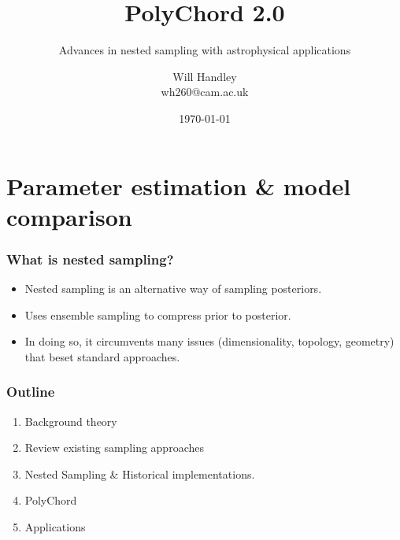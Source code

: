 \documentclass[%
]{beamer}
\title{PolyChord 2.0}
\subtitle{Advances in nested sampling with astrophysical applications}
\author[Handley] %
{Will Handley\\ \small{wh260@cam.ac.uk}}
\institute[University of Cambridge] %
{%
Astrophysics Group \\
Cavendish Laboratory \\
University of Cambridge
}
\date{\today}
\newcommand{\lik}{\mathcal{L}}
\newcommand{\posterior}{\mathcal{P}}
\newcommand{\prior}{\pi}
\newcommand{\ev}{\mathcal{Z}}
\newcommand{\prob}{\mathrm{P}}
\begin{document}
\begin{frame}
  \titlepage
\end{frame}


\section{Parameter estimation \& model comparison}
%
%
%

\begin{frame}
  \frametitle{What is nested sampling?}
  \begin{itemize}
    \pause\item Nested sampling is an alternative way of sampling posteriors. 
    \pause\item Uses ensemble sampling to compress prior to posterior.
    \pause\item In doing so, it circumvents many issues (dimensionality, topology, geometry) that beset standard approaches.
  \end{itemize}
\end{frame}

\begin{frame}
    \frametitle{Outline}
    \begin{enumerate}
        \pause\item Background theory
        \pause\item Review existing sampling approaches
        \pause\item Nested Sampling \& Historical implementations.
        \pause\item PolyChord
        \pause\item Applications
    \end{enumerate}
\end{frame}
\end{document}
